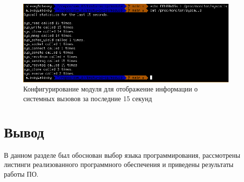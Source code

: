 \begin{figure}[h!]
	\begin{center}
		\includegraphics[scale=0.55]{img/syscalls_example_02.png}
	\end{center}
	\captionsetup{justification=centering}
	\caption{Конфигурирование модуля для отображение информации о системных вызовов за последние 15 секунд}
	\label{img:syscalls_example_02}
\end{figure}

\section*{Вывод}

В данном разделе был обоснован выбор языка программирования, рассмотрены листинги реализованного программного обеспечения и приведены результаты работы ПО.
